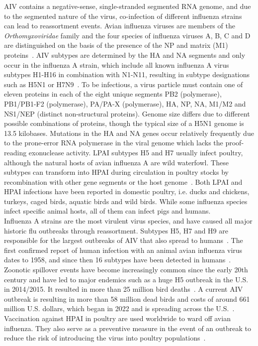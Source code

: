 \ac{AIV} contains a negative-sense, single-stranded segmented \ac{RNA} genome, and due to the segmented nature of the virus, co-infection of different influenza strains can lead to reassortment events. Avian influenza viruses are members of the \textit{Orthomyxoviridae} family and the four species of influenza viruses A, B, C and D are distinguished on the basis of the presence of the \ac{NP} and matrix (M1) proteins~\cite{webster1992evolution}. \ac{AIV} subtypes are determined by the \ac{HA} and \ac{NA} segments and only occur in the influenza A strain, which include all known influenza A virus subtypes H1-H16 in combination with N1-N11, resulting in subtype designations such as H5N1 or H7N9~\cite{webster1992evolution, krammer2018influenza}. To be infectious, a virus particle must contain one of eleven proteins in each of the eight unique segments PB2 (polymerase), PB1/PB1-F2 (polymerase), PA/PA-X (polymerase), \ac{HA}, \ac{NP}, \ac{NA}, M1/M2 and NS1/NEP (distinct non-structural proteins). Genome size differs due to different possible combinations of proteins, though the typical size of a H5N1 genome is 13.5 kilobases. Mutations in the \ac{HA} and \ac{NA} genes occur relatively frequently due to the prone-error \ac{RNA} polymerase in the viral genome which lacks the proof-reading exonuclease activity. \ac{LPAI} subtypes H5 and H7 usually infect poultry, although the natural hosts of avian influenza A are wild waterfowl. These subtypes can transform into \ac{HPAI} during circulation in poultry stocks by recombination with other gene segments or the host genome~\cite{webster2006h5n1}. Both \ac{LPAI} and \ac{HPAI} infections have been reported in domestic poultry, i.e. ducks and chickens, turkeys, caged birds, aquatic birds and wild birds. While some influenza species infect specific animal hosts, all of them can infect pigs and humans. \\
Influenza A strains are the most virulent virus species, and have caused all major historic flu outbreaks through reassortment. Subtypes H5, H7 and H9 are responsible for the largest outbreaks of \ac{AIV} that also spread to humans~\cite{widdowson2017global}. The first confirmed report of human infection with an animal avian influenza virus dates to 1958, and since then 16 subtypes have been detected in humans~\cite{kluska1961demonstration}. Zoonotic spillover events have become increasingly common since the early 20th century and have led to major endemics such as a huge H5 outbreak in the U.S. in 2014/2015. It resulted in more than 25 million bird deaths~\cite{seeger2021poultry}. A current \ac{AIV} outbreak is resulting in more than 58 million dead birds and costs of around 661 million U.S. dollars, which began in 2022 and is spreading across the U.S.~\cite{usda2023hpai}. 
Vaccination against \ac{HPAI} in poultry are used worldwide to ward off avian influenza. They also serve as a preventive measure in the event of an outbreak to reduce the risk of introducing the virus into poultry populations~\cite{swayne2013current, swayne2011assessment}. 

